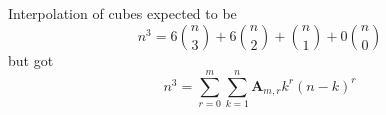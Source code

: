 Interpolation of cubes expected to be
\[
    n^3 = 6 \binom{n}{3} + 6 \binom{n}{2} + \binom{n}{1} + 0 \binom{n}{0}
\]
but got
\[
    n^3 = \sum_{r=0}^{m} \sum_{k=1}^{n} \mathbf{A}_{m,r} k^r (n-k)^r
\]
